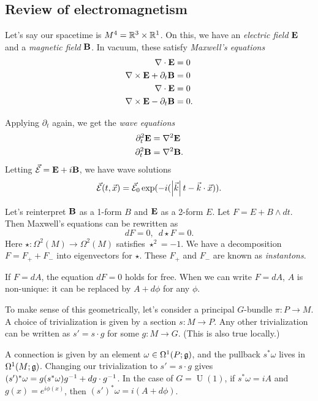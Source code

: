 \documentclass{article}
\begin{document}
\subsection{Review of electromagnetism}

Let's say our spacetime is $M^4 = \mathbb{R}^3 \times \mathbb{R}^1$.
On this, we have an \emph{electric field} $\mathbf{E}$ and a \emph{magnetic field} $\mathbf{B}$.
In vacuum, these satisfy \emph{Maxwell's equations}
\begin{align*}
	\nabla \cdot \mathbf{E} &= 0 \\
	\nabla \times \mathbf{E} + \partial_t \mathbf{B} &= 0 \\
	\nabla \cdot \mathbf{E} &= 0 \\
	\nabla \times \mathbf{E} - \partial_t \mathbf{B} &= 0.
\end{align*}

Applying $\partial_t$ again, we get the \emph{wave equations}
\begin{align*}
	\partial_t^2 \mathbf{E} &= \nabla^2 \mathbf{E} \\
	\partial_t^2 \mathbf{B} &= \nabla^2 \mathbf{B}.
\end{align*}
Letting $\vec{\mathcal{E}} = \mathbf{E} + i \mathbf{B}$, we have wave solutions
\[
	\vec{\mathcal{E}}(t, \vec{x}) = \vec{\mathcal{E}}_0 \exp(-i(\left|{\vec{k}}\right| t - \vec{k} \cdot \vec{x})).
\]

Let's reinterpret $\mathbf{B}$ as a 1-form $B$ and $\mathbf{E}$ as a 2-form $E$.
Let $F = E + B \wedge dt$.
Then Maxwell's equations can be rewritten as
\[
	d F = 0, \,\,\, d \star F = 0.
\]
Here $\star: \Omega^2(M) \to \Omega^2(M)$ satisfies $\star^2 = -1$.
We have a decomposition $F = F_+ + F_-$ into eigenvectors for $\star$.
These $F_+$ and $F_-$ are known as \emph{instantons}.

If $F = dA$, the equation $dF = 0$ holds for free.
When we can write $F = dA$, $A$ is non-unique: it can be replaced by $A + d\phi$ for any $\phi$.

To make sense of this geometrically, let's consider a principal $G$-bundle $\pi: P \to M$.
A choice of trivialization is given by a section $s: M \to P$.
Any other trivialization can be written as $s' = s \cdot g$ for some $g: M \to G$.
(This is also true locally.)

A connection is given by an element $\omega \in \Omega^1(P; \mathfrak{g})$, and the pullback $s^* \omega$ lives in $\Omega^1(M; \mathfrak{g})$.
Changing our trivialization to $s' = s \cdot g$ gives $(s')^* \omega = g (s^* \omega) g^{-1} + dg \cdot g^{-1}$.
In the case of $G = \mathop{U}(1)$, if $s^* \omega = i A$ and $g(x) = e^{i \phi(x)}$, then $(s')^* \omega = i(A + d\phi)$.
\end{document}
